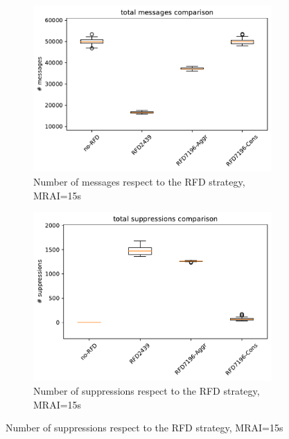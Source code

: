 \begin{figure}[H]
\begin{subfigure}[b]{0.325\textwidth}
         \label{fig:1000_RFD_MRAI30_time_mice}
     \end{subfigure}
     \hfill
     \begin{subfigure}[b]{0.325\textwidth}
         \centering
         \includegraphics[width=\textwidth]{images/RFD/miceVSelephants/MultiMRAI/15/mice/cisco_1000MRAI15_rfd_comparison_messages_boxplot.pdf}
         \caption{Number of messages respect to the RFD strategy, MRAI=15s}
         \label{fig:1000_RFD_MRAI30_messages_mice}
     \end{subfigure}
     \hfill
     \begin{subfigure}[b]{0.325\textwidth}
         \centering
         \includegraphics[width=\textwidth]{images/RFD/miceVSelephants/MultiMRAI/15/mice/cisco_1000MRAI15_rfd_comparison_suppressions_boxplot.pdf}
         \caption{Number of suppressions respect to the RFD strategy, MRAI=15s}

\end{subfigure}
\end{figure}
